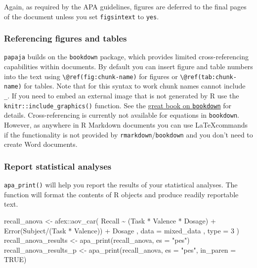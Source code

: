 \documentclass[
  man,floatsintext]{apa6}
\newenvironment{Shaded}{\begin{snugshade}}{\end{snugshade}}
\newcommand{\AttributeTok}[1]{\textcolor[rgb]{0.77,0.63,0.00}{#1}}
\newcommand{\ConstantTok}[1]{\textcolor[rgb]{0.00,0.00,0.00}{#1}}
\newcommand{\DecValTok}[1]{\textcolor[rgb]{0.00,0.00,0.81}{#1}}
\newcommand{\FunctionTok}[1]{\textcolor[rgb]{0.00,0.00,0.00}{#1}}
\newcommand{\NormalTok}[1]{#1}
\newcommand{\OtherTok}[1]{\textcolor[rgb]{0.56,0.35,0.01}{#1}}
\newcommand{\SpecialCharTok}[1]{\textcolor[rgb]{0.00,0.00,0.00}{#1}}
\newcommand{\StringTok}[1]{\textcolor[rgb]{0.31,0.60,0.02}{#1}}
\begin{document}
Again, as required by the APA guidelines, figures are deferred to the final pages of the document unless you set \texttt{figsintext} to \texttt{yes}.

\hypertarget{referencing-figures-and-tables}{%
\subsubsection{Referencing figures and tables}\label{referencing-figures-and-tables}}

\texttt{papaja} builds on the \texttt{bookdown} package, which provides limited cross-referencing capabilities within documents.
By default you can insert figure and table numbers into the text using \texttt{\textbackslash{}@ref(fig:chunk-name)} for figures or \texttt{\textbackslash{}@ref(tab:chunk-name)} for tables.
Note that for this syntax to work chunk names cannot include \texttt{\_}.
If you need to embed an external image that is not generated by R use the \texttt{knitr::include\_graphics()} function.
See the \href{https://bookdown.org/yihui/bookdown/cross-references.html}{great book on \texttt{bookdown}} for details.
Cross-referencing is currently not available for equations in \texttt{bookdown}.
However, as anywhere in R Markdown documents you can use \LaTeX commands if the functionality is not provided by \texttt{rmarkdown}/\texttt{bookdown} and you don't need to create Word documents.

\hypertarget{report-statistical-analyses}{%
\subsubsection{Report statistical analyses}\label{report-statistical-analyses}}

\texttt{apa\_print()} will help you report the results of your statistical analyses.
The function will format the contents of R objects and produce readily reportable text.

\begin{Shaded}
\begin{Highlighting}[]
\NormalTok{recall\_anova }\OtherTok{\textless{}{-}}\NormalTok{ afex}\SpecialCharTok{::}\FunctionTok{aov\_car}\NormalTok{(}
\NormalTok{  Recall }\SpecialCharTok{\textasciitilde{}}\NormalTok{ (Task }\SpecialCharTok{*}\NormalTok{ Valence }\SpecialCharTok{*}\NormalTok{ Dosage) }\SpecialCharTok{+} \FunctionTok{Error}\NormalTok{(Subject}\SpecialCharTok{/}\NormalTok{(Task }\SpecialCharTok{*}\NormalTok{ Valence)) }\SpecialCharTok{+}\NormalTok{ Dosage}
\NormalTok{  , }\AttributeTok{data =}\NormalTok{ mixed\_data}
\NormalTok{  , }\AttributeTok{type =} \DecValTok{3}
\NormalTok{)}
\NormalTok{recall\_anova\_results }\OtherTok{\textless{}{-}} \FunctionTok{apa\_print}\NormalTok{(recall\_anova, }\AttributeTok{es =} \StringTok{"pes"}\NormalTok{)}
\NormalTok{recall\_anova\_results\_p }\OtherTok{\textless{}{-}} \FunctionTok{apa\_print}\NormalTok{(recall\_anova, }\AttributeTok{es =} \StringTok{"pes"}\NormalTok{, }\AttributeTok{in\_paren =} \ConstantTok{TRUE}\NormalTok{)}
\end{Highlighting}
\end{Shaded}
\end{document}
